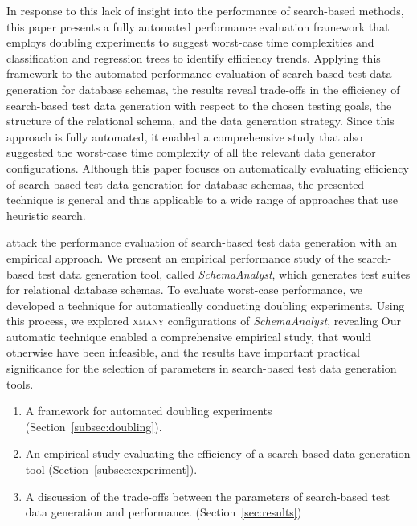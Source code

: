 In response to this lack of insight into the performance of search-based methods, this paper presents a fully automated
performance evaluation framework that employs doubling experiments to suggest worst-case time complexities and
classification and regression trees to identify efficiency trends. Applying this framework to the automated performance
evaluation of search-based test data generation for database schemas, the results reveal trade-offs in the efficiency of
search-based test data generation with respect to the chosen testing goals, the structure of the relational
schema, and the data generation strategy. Since this approach is fully automated, it enabled a comprehensive study that
also suggested the worst-case time complexity of all the relevant data generator configurations. Although this paper
focuses on automatically evaluating efficiency of search-based test data generation for database schemas, the presented
technique is general and thus applicable to a wide range of approaches that use heuristic search.

attack the performance evaluation of search-based test data generation with an empirical
approach. We present an empirical performance study of the search-based test data generation tool, called
\textit{SchemaAnalyst}, which generates test suites for relational database schemas. To evaluate worst-case performance,
we developed a technique for automatically conducting doubling experiments. Using this process, we explored
\textsc{xmany} configurations of \textit{SchemaAnalyst}, revealing 
Our automatic technique enabled a comprehensive empirical study, that would otherwise have been infeasible, and the
results have important practical significance for the selection of parameters in search-based test data generation
tools.

\begin{enumerate}
  \item A framework for automated doubling experiments
    (Section~\ref{subsec:doubling}).
  \item An empirical study evaluating the efficiency of a search-based
    data generation tool (Section~\ref{subsec:experiment}).
  \item A discussion of the trade-offs between the parameters of
    search-based test data generation and performance.
    (Section~\ref{sec:results})
  \end{enumerate}
